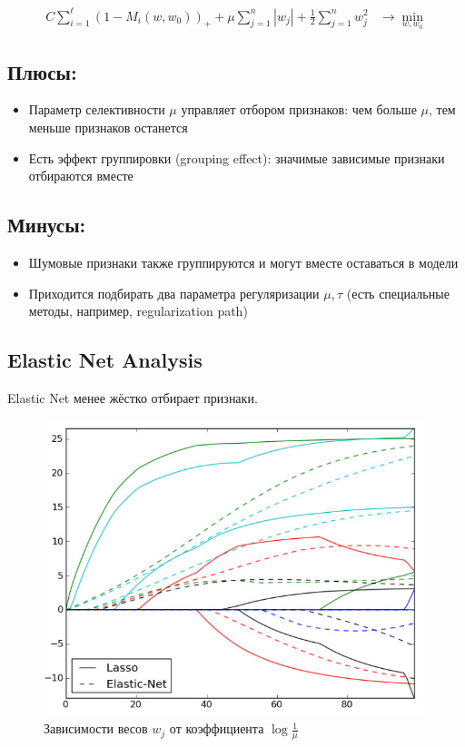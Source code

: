 \begin{align*}
    C \sum_{i=1}^{\ell} \left(1 - M_i(w, w_0)\right)_+ + \mu \sum_{j=1}^{n} |w_j| + \frac{1}{2} \sum_{j=1}^{n} w_j^2 & \rightarrow \min_{w, w_0}
\end{align*}

\subsection*{Плюсы:}
\begin{itemize}
    \item Параметр селективности \(\mu\) управляет отбором признаков: чем больше \(\mu\), тем меньше признаков останется
    \item Есть эффект группировки (grouping effect): значимые зависимые признаки отбираются вместе
\end{itemize}

\subsection*{Минусы:}
\begin{itemize}
    \item Шумовые признаки также группируются и могут вместе оставаться в модели
    \item Приходится подбирать два параметра регуляризации \(\mu, \tau\) (есть специальные методы, например, regularization path)
\end{itemize}

\subsection{Elastic Net Analysis}

Elastic Net менее жёстко отбирает признаки.

\begin{figure}[ht]
    \centering
    \includegraphics[width=0.8\linewidth]{chapters/svm/images/Elastic_Net.png}
    \caption{Зависимости весов \(w_j\) от коэффициента \(\log \frac{1}{\mu}\)}
    \label{fig:mpr}
\end{figure}

